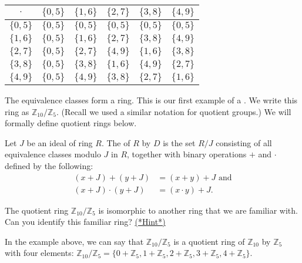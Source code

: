 \begin{example}
\begin{center}
\begin{tabular}{c|c|c|c|c|c}
$\cdot$ & $\{0,5\}$ & $\{1,6\}$ & $\{2,7\}$ & $\{3,8\}$ & $\{4,9\}$ \\
\hline
$\{0,5\}$ & $\{0,5\}$ & $\{0,5\}$ & $\{0,5\}$ & $\{0,5\}$ & $\{0,5\}$ \\
\hline
$\{1,6\}$ & $\{0,5\}$ & $\{1,6\}$ & $\{2,7\}$ & $\{3,8\}$ & $\{4,9\}$ \\
\hline
$\{2,7\}$ & $\{0,5\}$ & $\{2,7\}$ & $\{4,9\}$ & $\{1,6\}$ & $\{3,8\}$ \\
\hline
$\{3,8\}$ & $\{0,5\}$ & $\{3,8\}$ & $\{1,6\}$ & $\{4,9\}$ & $\{2,7\}$ \\
\hline
$\{4,9\}$ & $\{0,5\}$ & $\{4,9\}$ & $\{3,8\}$ & $\{2,7\}$ & $\{1,6\}$ \\
\end{tabular}
\end{center}
\end{example}

The equivalence classes form a ring.  This is our first example of a .  We write this ring as ${\mathbb Z}_{10}/{\mathbb Z}_5$.  (Recall we used a similar notation for quotient groups.)  We will formally define quotient rings below.

\begin{defn}\label{quotient ring}
Let $J$ be an ideal of ring $R$.  The  of $R$ by $D$ is the set $R/J$ consisting of all equivalence classes modulo $J$ in $R$, together with binary operations $+$ and $\cdot$ defined by the following:
\begin{align*}
(x+J)+(y+J)&=(x+y)+J \text{ and}\\
(x+J)\cdot(y+J)&=(x\cdot y)+J.
\end{align*}
\end{defn}

\begin{exercise}\label{exercise:rings:Iso_Z10_to_Z5}
The quotient ring ${\mathbb Z}_{10}/{\mathbb Z}_5$ is isomorphic to another ring that we are familiar with. Can you identify this familiar ring?  \hyperref[ringsHints]{(*Hint*)} 
\end{exercise}

In the example above, we can say that ${\mathbb Z}_{10}/{\mathbb Z}_5$ is a quotient ring of ${\mathbb Z}_{10}$ by ${\mathbb Z}_5$ with four elements:
${\mathbb Z}_{10}/{\mathbb Z}_5=\{0+{\mathbb Z}_5, 1+{\mathbb Z}_5, 2+{\mathbb Z}_5, 3+{\mathbb Z}_5, 4+{\mathbb Z}_5\}$.


